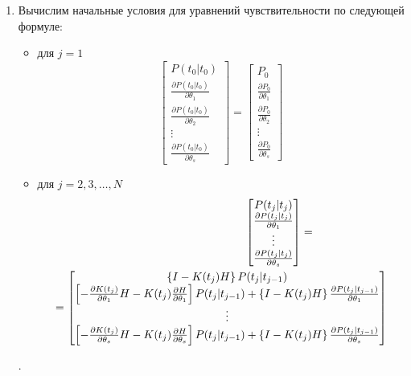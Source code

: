 \documentclass[a4paper,14pt]{extarticle}
\newcommand{\pd}[2]{\frac{\partial #1}{\partial #2}}
\begin{document}
\begin{enumerate}
\item Вычислим начальные условия для уравнений чувствительности по следующей
	формуле:
\begin{itemize}
		\item для $j=1$
\begin{equation}
	\label{eq:init_cond_1}
	\begin{bmatrix} 
		P(t_0|t_0) \\ 
		\pd{P(t_0|t_0)}{\theta_1} \\
		\pd{P(t_0|t_0)}{\theta_2} \\
		\vdots \\
		\pd{P(t_0|t_0)}{\theta_s}
	\end{bmatrix} =
	\begin{bmatrix}
		P_0 \\
		\pd{P_0}{\theta_1} \\
		\pd{P_0}{\theta_2} \\
		\vdots \\
		\pd{P_0}{\theta_s}
	\end{bmatrix}
\end{equation}
\item для $j=2,3,\ldots,N$
	\begin{multline}
		\label{eq:init_cond_2}
		\hspace{0.3\textwidth}
		\begin{bmatrix}
			P(t_j|t_j) \\
			\pd{P(t_j|t_j)}{\theta_1} \\
			\vdots \\
			\pd{P(t_j|t_j)}{\theta_s}
		\end{bmatrix} = \\ =
	  \begin{bmatrix}
			\left\{ I - K(t_j) H \right\} P(t_j|t_{j-1}) \\ 
			\left[
				-\pd{K(t_j)}{\theta_1} H - K(t_j) \pd{H}{\theta_1} \right]
			P(t_j|t_{j-1}) + \left\{ I - K(t_j) H \right\}
			\pd{P(t_j|t_{j-1})}{\theta_1} \\
			\vdots \\
			\left[
				-\pd{K(t_j)}{\theta_s} H - K(t_j) \pd{H}{\theta_s} \right]
			P(t_j|t_{j-1}) + \left\{ I - K(t_j) H \right\}
			\pd{P(t_j|t_{j-1})}{\theta_s} 
		\end{bmatrix}
	\end{multline}
\end{itemize}.


\end{enumerate}
\end{document}
